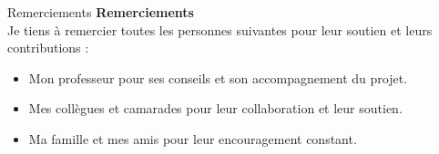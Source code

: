 \documentclass{beamer}
\begin{document}
\begin{frame}{Remerciements}
    \centering
    \Huge{\textbf{Remerciements}} \\[1cm]
    
    \Large{Je tiens à remercier toutes les personnes suivantes pour leur soutien et leurs contributions :}
    \vspace{0.5cm}
    \begin{itemize}
        \item Mon professeur pour ses conseils et son accompagnement du projet.
        \item Mes collègues et camarades pour leur collaboration et leur soutien.
        \item Ma famille et mes amis pour leur encouragement constant.
    \end{itemize}
    \vspace{1cm}
    
\end{frame}
\end{document}
